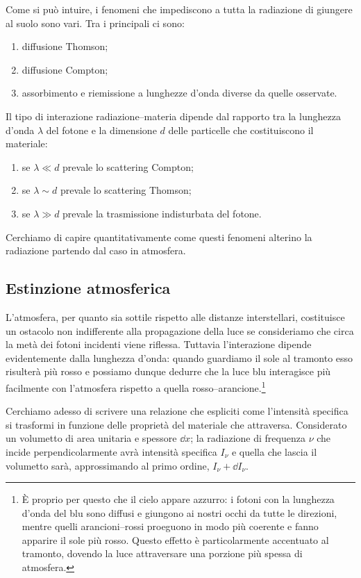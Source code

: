     Come si può intuire, i fenomeni che impediscono a tutta la radiazione di giungere al suolo sono vari. Tra i principali ci sono:
    \begin{enumerate}[label=\ding{70}]
        \item diffusione Thomson;
        \item diffusione Compton;
        \item assorbimento e riemissione a lunghezze d'onda diverse da quelle osservate.
    \end{enumerate}
    Il tipo di interazione radiazione--materia dipende dal rapporto tra la lunghezza d'onda $\lambda$ del fotone e la dimensione $d$ delle particelle che costituiscono il materiale:
    \begin{enumerate}[label=\ding{70}]
        \item se $\lambda \ll d$ prevale lo scattering Compton;
        \item se $\lambda \sim d$ prevale lo scattering Thomson;
        \item se $\lambda \gg d$ prevale la trasmissione indisturbata del fotone. 
    \end{enumerate}
    
    Cerchiamo di capire quantitativamente come questi fenomeni alterino la radiazione partendo dal caso in atmosfera.
    \subsection{Estinzione atmosferica}
        L'atmosfera, per quanto sia sottile rispetto alle distanze interstellari, costituisce un ostacolo non indifferente alla propagazione della luce se consideriamo che circa la metà dei fotoni incidenti viene riflessa. Tuttavia l'interazione dipende evidentemente dalla lunghezza d'onda: quando guardiamo il sole al tramonto esso risulterà più rosso e possiamo dunque dedurre che la luce blu interagisce più facilmente con l'atmosfera rispetto a quella rosso--arancione.\footnote{È proprio per questo che il cielo appare azzurro: i fotoni con la lunghezza d'onda del blu sono diffusi e giungono ai nostri occhi da tutte le direzioni, mentre quelli arancioni--rossi proeguono in modo più coerente e fanno apparire il sole più rosso. Questo effetto è particolarmente accentuato al tramonto, dovendo la luce attraversare una porzione più spessa di atmosfera.}

        Cerchiamo adesso di scrivere una relazione che espliciti come l'intensità specifica si trasformi in funzione delle proprietà del materiale che attraversa. Considerato un volumetto di area unitaria e spessore $\dd{x}$; la radiazione di frequenza $\nu$ che incide perpendicolarmente avrà intensità specifica $I_\nu$ e quella che lascia il volumetto sarà, approssimando al primo ordine, $I_\nu + \dd{I_\nu}$.

